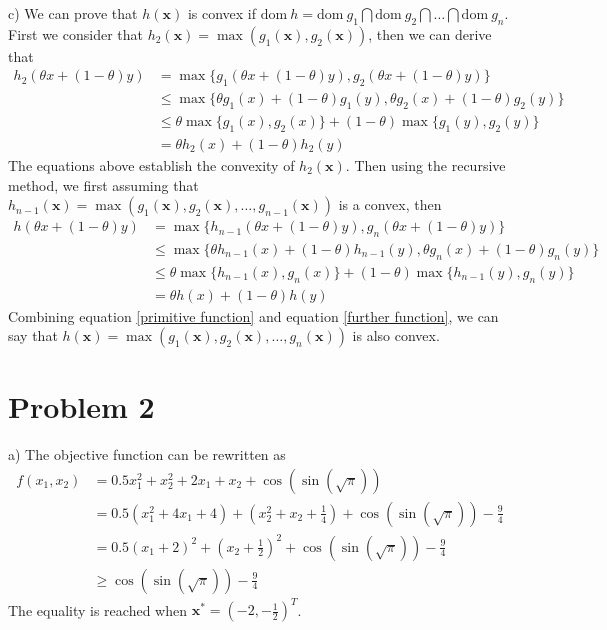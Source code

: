 \documentclass{article}
\begin{document}
c) We can prove that $h(\bm{x})$ is convex if $\bm{\mathrm{dom}}\ h = \bm{\mathrm{dom}}\ g_1 \bigcap \bm{\mathrm{dom}}\ g_2 \bigcap \dots \bigcap \bm{\mathrm{dom}}\ g_n$. \\
First we consider that $h_2(\bm{x}) = \max (g_1(\bm{x}), g_2(\bm{x}))$,  then we can derive that
\begin{equation}
	\begin{aligned}
		h_2(\theta x + (1-\theta)y)
		&= \max \{g_1(\theta x + (1-\theta)y), g_2(\theta x + (1-\theta)y)\}\\
		&\leq \max \{\theta g_1(x) +(1-\theta)g_1(y), \theta g_2(x) +(1-\theta)g_2(y)\}\\
		&\leq \theta \max\{g_1(x), g_2(x)\} + (1-\theta)\max\{g_1(y), g_2(y)\}\\
		&= \theta h_2(x) + (1-\theta)h_2(y)
	\end{aligned}
	\label{primitive function}
\end{equation}
The equations above establish the convexity of $h_2(\bm{x})$. Then  using the recursive method, we first assuming that $h_{n-1}(\bm{x}) = \max (g_1(\bm{x}), g_2(\bm{x}), \dots, g_{n-1}(\bm{x}))$ is a convex, then
\begin{equation}
	\begin{aligned}
		h(\theta x + (1-\theta)y)
		&= \max \{h_{n-1}(\theta x + (1-\theta)y), g_n(\theta x + (1-\theta)y)\}\\
		&\leq \max \{\theta h_{n-1}(x) +(1-\theta)h_{n-1}(y), \theta g_n(x) +(1-\theta)g_n(y)\}\\
		&\leq \theta \max\{h_{n-1}(x), g_n(x)\} + (1-\theta)\max\{h_{n-1}(y), g_n(y)\}\\
		&= \theta h(x) + (1-\theta)h(y)
	\end{aligned}
	\label{further function}
\end{equation}
Combining equation \ref{primitive function} and equation \ref{further function}, we can say that $h(\bm{x}) = \max (g_1(\bm{x}), g_2(\bm{x}), \dots, g_n(\bm{x}))$ is also convex.

\section*{Problem 2}
a) The objective function can be rewritten as
\begin{equation}
	\begin{aligned}
		f(x_1, x_2)
		&= 0.5x_1^2 + x_2^2 + 2x_1 + x_2 + \cos(\sin(\sqrt{\pi}))\\
		&= 0.5(x_1^2 + 4x_1 + 4) + (x_2^2 + x_2 + \frac{1}{4}) + \cos(\sin(\sqrt{\pi})) - \frac{9}{4}\\
		&= 0.5(x_1 + 2)^2 + (x_2 + \frac{1}{2})^2 + \cos(\sin(\sqrt{\pi})) - \frac{9}{4}\\
		&\geq \cos(\sin(\sqrt{\pi})) - \frac{9}{4}
	\end{aligned}
\end{equation}
The equality is reached when $\bm{x}^* = (-2, -\frac{1}{2})^T$.
\end{document}
